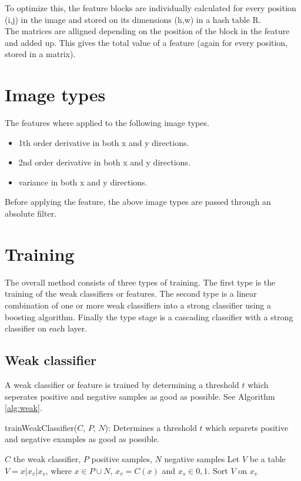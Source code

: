 \documentclass[a4paper,11pt]{article}
\begin{document}
	To optimize this, the feature blocks are individually calculated for every
	position (i,j) in the image and stored on its dimensions (h,w) in a hash
	table R.\\
	The matrices are alligned depending on the position of the block in the
	feature and added up. This gives the total value of a feature (again for
	every position, stored in a matrix).

	\section{Image types}
	The features where applied to the following image types.
	\begin{itemize}
		\item{1th order derivative in both x and y directions.}
		\item{2nd order derivative in both x and y directions.}
		\item{variance in both x and y directions.}
	\end{itemize}
	Before applying the feature, the above image types are passed through an
	absolute filter.


\section*{Training}
The overall method consists of three types of training. The first type is the
training of the weak classifiers or features. The second type is a linear
combination of one or more weak classifiers into a strong classifier using a
boosting algorithm. Finally the type stage is a cascading classifier with a
strong classifier on each layer.
\subsection*{Weak classifier}
A weak classifier or feature is trained by determining a threshold $t$ which
seperates positive and negative samples as good as possible. See Algorithm
\ref{alg:weak}.
\begin{algorithm}
	\caption{trainWeakClassifier($C$, $P$, $N$): Determines a threshold $t$ which
	separets positive and negative examples as good as possible.}
	\begin{algorithmic}[1]
	\REQUIRE $C$ the weak classifier, $P$ positive samples, $N$ negative samples
	\medskip
	\STATE Let $V$ be a table $V = x|x_v|x_s$, where $x \in P \cup N$, $x_v = C(x)$ and $x_s \in {0,1}$.
	\STATE Sort $V$ on $x_v$
		\STATE 
	\ENDFOR
	
	\end{algorithmic}
\label{alg:weak}
\end{algorithm}
\end{document}
